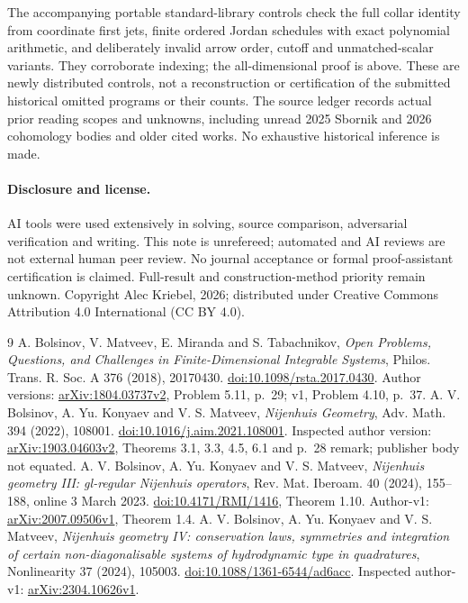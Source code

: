 \documentclass[11pt]{article}
\begin{document}
The accompanying portable standard-library controls check the full collar
identity from coordinate first jets, finite ordered Jordan schedules with
exact polynomial arithmetic, and deliberately invalid arrow order,
cutoff and unmatched-scalar variants. They corroborate indexing; the
all-dimensional proof is above. These are newly distributed controls, not
a reconstruction or certification of the submitted historical omitted
programs or their counts. The source ledger records actual prior reading
scopes and unknowns, including unread 2025 Sbornik and 2026 cohomology
bodies and older cited works. No exhaustive historical inference is made.

\paragraph{Disclosure and license.}
AI tools were used extensively in solving, source comparison, adversarial
verification and writing. This note is unrefereed; automated and AI reviews
are not external human peer review. No journal acceptance or formal
proof-assistant certification is claimed. Full-result and construction-method
priority remain unknown. Copyright Alec Kriebel, 2026; distributed under
Creative Commons Attribution 4.0 International (CC BY 4.0).

\begin{thebibliography}{9}
 A. Bolsinov, V. Matveev, E. Miranda and S. Tabachnikov,
\emph{Open Problems, Questions, and Challenges in Finite-Dimensional
Integrable Systems}, Philos. Trans. R. Soc. A 376 (2018), 20170430.
\href{https://doi.org/10.1098/rsta.2017.0430}{doi:10.1098/rsta.2017.0430}.
Author versions: \href{https://arxiv.org/abs/1804.03737v2}{arXiv:1804.03737v2},
Problem 5.11, p.~29; v1, Problem 4.10, p.~37.
 A. V. Bolsinov, A. Yu. Konyaev and V. S. Matveev,
\emph{Nijenhuis Geometry}, Adv. Math. 394 (2022), 108001.
\href{https://doi.org/10.1016/j.aim.2021.108001}{doi:10.1016/j.aim.2021.108001}.
Inspected author version: \href{https://arxiv.org/abs/1903.04603v2}{arXiv:1903.04603v2},
Theorems 3.1, 3.3, 4.5, 6.1 and p.~28 remark; publisher body not equated.
 A. V. Bolsinov, A. Yu. Konyaev and V. S. Matveev,
\emph{Nijenhuis geometry III: gl-regular Nijenhuis operators}, Rev. Mat.
Iberoam. 40 (2024), 155--188, online 3 March 2023.
\href{https://doi.org/10.4171/RMI/1416}{doi:10.4171/RMI/1416}, Theorem 1.10.
Author-v1: \href{https://arxiv.org/abs/2007.09506v1}{arXiv:2007.09506v1}, Theorem 1.4.
 A. V. Bolsinov, A. Yu. Konyaev and V. S. Matveev,
\emph{Nijenhuis geometry IV: conservation laws, symmetries and integration
of certain non-diagonalisable systems of hydrodynamic type in quadratures},
Nonlinearity 37 (2024), 105003.
\href{https://doi.org/10.1088/1361-6544/ad6acc}{doi:10.1088/1361-6544/ad6acc}.
Inspected author-v1: \href{https://arxiv.org/abs/2304.10626v1}{arXiv:2304.10626v1}.
\end{thebibliography}
\end{document}
